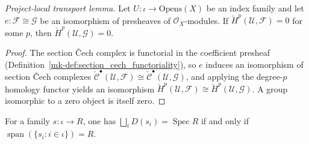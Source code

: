 \begin{lemma}\label{mk-lem:cechCohomology_isZero_of_iso}
  \leanok

  \textit{Project-local transport lemma.}
  Let \(U : \iota \to \mathrm{Opens}(X)\) be an index family and let \(e : \mathcal{F} \cong
  \mathcal{G}\) be an isomorphism of presheaves of \(\mathcal{O}_X\)-modules. If
  \(\check{H}^p(\mathcal{U}, \mathcal{F}) = 0\) for some \(p\), then
  \(\check{H}^p(\mathcal{U}, \mathcal{G}) = 0\).
\end{lemma}
\begin{proof}
  \leanok
  The section {\v C}ech complex is functorial in the coefficient presheaf
  (Definition~\ref{mk-def:section_cech_functoriality}), so \(e\) induces an isomorphism of section
  {\v C}ech complexes \(\check{\mathcal{C}}^\bullet(\mathcal{U}, \mathcal{F}) \cong
  \check{\mathcal{C}}^\bullet(\mathcal{U}, \mathcal{G})\), and applying the degree-\(p\) homology
  functor yields an isomorphism \(\check{H}^p(\mathcal{U}, \mathcal{F}) \cong
  \check{H}^p(\mathcal{U}, \mathcal{G})\). A group isomorphic to a zero object is itself zero.
\end{proof}

\begin{lemma}
  \label{mk-lem:iSup_basicOpen_eq_top_iff_span}
  \mathlibok

  For a family \(s : \iota \to R\), one has \(\bigsqcup_i D(s_i) = \operatorname{Spec} R\) if and only
  if \(\operatorname{span}(\{s_i : i \in \iota\}) = R\).
\end{lemma}

